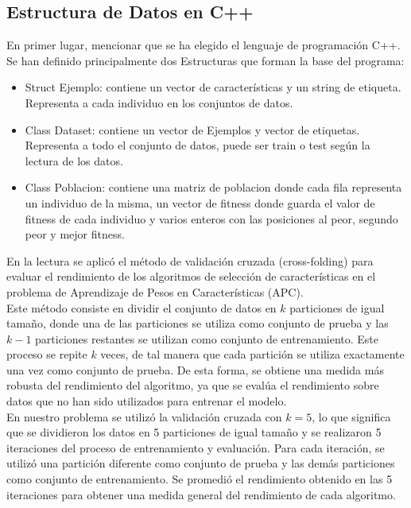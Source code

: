 \subsection{Estructura de Datos en C++}
En primer lugar, mencionar que se ha elegido el lenguaje de programación C++. Se han definido principalmente dos Estructuras que forman la base del programa:
\begin{itemize}
	\item Struct Ejemplo: contiene un vector de características y un string de etiqueta. Representa a cada individuo en los conjuntos de datos.
	\item Class Dataset: contiene un vector de Ejemplos y vector de etiquetas. Representa a todo el conjunto de datos, puede ser train o test según la lectura de los datos.
	
	\item Class Poblacion: contiene una matriz de poblacion donde cada fila representa un individuo de la misma, un vector de fitness donde guarda el valor de fitness de cada individuo y varios enteros con las posiciones al peor, segundo peor y mejor fitness.
\end{itemize}

En la lectura se aplicó el método de validación cruzada (cross-folding) para evaluar el rendimiento de los algoritmos de selección de características en el problema de Aprendizaje de Pesos en Características (APC). \\

Este método consiste en dividir el conjunto de datos en $k$ particiones de igual tamaño, donde una de las particiones se utiliza como conjunto de prueba y las $k-1$ particiones restantes se utilizan como conjunto de entrenamiento. Este proceso se repite $k$ veces, de tal manera que cada partición se utiliza exactamente una vez como conjunto de prueba. De esta forma, se obtiene una medida más robusta del rendimiento del algoritmo, ya que se evalúa el rendimiento sobre datos que no han sido utilizados para entrenar el modelo. \\

En nuestro problema se utilizó la validación cruzada con $k=5$, lo que significa que se dividieron los datos en 5 particiones de igual tamaño y se realizaron 5 iteraciones del proceso de entrenamiento y evaluación. Para cada iteración, se utilizó una partición diferente como conjunto de prueba y las demás particiones como conjunto de entrenamiento. Se promedió el rendimiento obtenido en las 5 iteraciones para obtener una medida general del rendimiento de cada algoritmo. \\


